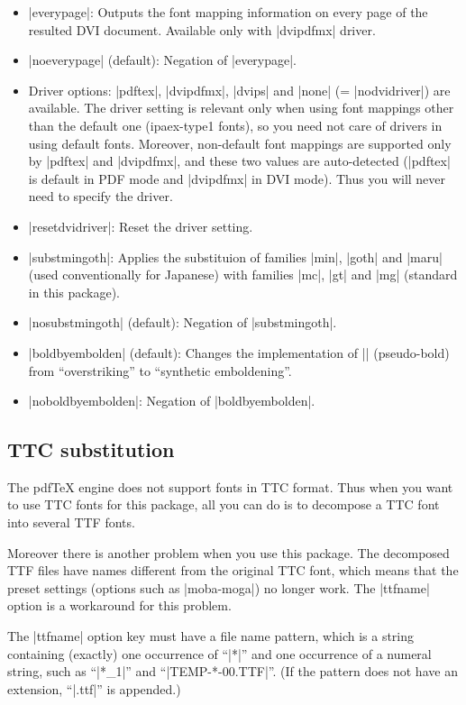 \documentclass[a4paper]{article}
\newcommand{\Means}{:\hspace{1em plus 1em}}
\providecommand{\pdfTeX}{pdf\/\TeX}
\begin{document}
\begin{itemize}
\item |everypage|\Means
  Outputs the font mapping information on every page of the resulted
  DVI document.
  Available only with |dvipdfmx| driver.
\item |noeverypage| (default)\Means
  Negation of |everypage|.
\item Driver options\Means
  |pdftex|, |dvipdfmx|, |dvips| and |none| (= |nodvidriver|)
  are available.
  The driver setting is relevant only when using font mappings other
  than the default one (ipaex-type1 fonts), so you need not care of
  drivers in using default fonts.
  Moreover, non-default font mappings are supported only by |pdftex|
  and |dvipdfmx|, and these two values are auto-detected
  (|pdftex| is default in PDF mode and |dvipdfmx| in DVI mode).
  Thus you will never need to specify the driver.
\item |resetdvidriver|\Means
  Reset the driver setting.
\item |substmingoth|\Means
  Applies the substituion of families |min|, |goth| and |maru|
  (used conventionally for Japanese) with families |mc|, |gt| and |mg|
  (standard in this package).
\item |nosubstmingoth| (default)\Means
  Negation of |substmingoth|.
\item |boldbyembolden| (default)\Means
  Changes the implementation of |\CJKbold| (pseudo-bold) from
  ``overstriking'' to ``synthetic emboldening''.
\item |noboldbyembolden|\Means
  Negation of |boldbyembolden|.
\end{itemize}

\subsection{TTC substitution}
\label{ssec:ttfname}

The {\pdfTeX} engine does not support fonts in TTC format.
Thus when you want to use TTC fonts for this package,
all you can do is to decompose a TTC font
into several TTF fonts.

Moreover there is another problem when you use this package.
The decomposed TTF files have names
different from the original TTC font,
which means that
the preset settings (options such as |moba-moga|) no longer work.
The |ttfname| option is a workaround for this problem.

The |ttfname| option key must have a file name pattern,
which is a string containing (exactly) one occurrence of ``|*|''
and one occurrence of a numeral string,
such as ``|*_1|'' and ``|TEMP-*-00.TTF|''.
(If the pattern does not have an extension, ``|.ttf|'' is appended.)
\end{document}
